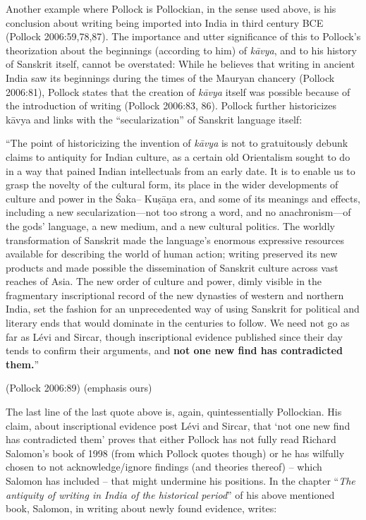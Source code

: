Another example where Pollock is Pollockian, in the sense used above, is his conclusion about writing being imported into India in third century BCE (Pollock 2006:59,78,87). The importance and utter significance of this to Pollock’s theorization about the beginnings (according to him) of \textit{kāvya}, and to his history of Sanskrit itself, cannot be overstated: While he believes that writing in ancient India saw its beginnings during the times of the Mauryan chancery (Pollock 2006:81), Pollock states that the creation of \textit{kāvya} itself was possible because of the introduction of writing (Pollock 2006:83, 86). Pollock further historicizes kāvya and links with the “secularization” of Sanskrit language itself:

\begin{myquote}
“The point of historicizing the invention of \textit{kāvya} is not to gratuitously debunk claims to antiquity for Indian culture, as a certain old Orientalism sought to do in a way that pained Indian intellectuals from an early date. It is to enable us to grasp the novelty of the cultural form, its place in the wider developments of culture and power in the Śaka– Kuṣāṇa era, and some of its meanings and effects, including a new secularization—not too strong a word, and no anachronism—of the gods’ language, a new medium, and a new cultural politics. The worldly transformation of Sanskrit made the language’s enormous expressive resources available for describing the world of human action; writing preserved its new products and made possible the dissemination of Sanskrit culture across vast reaches of Asia. The new order of culture and power, dimly visible in the fragmentary inscriptional record of the new dynasties of western and northern India, set the fashion for an unprecedented way of using Sanskrit for political and literary ends that would dominate in the centuries to follow. We need not go as far as Lévi and Sircar, though inscriptional evidence published since their day tends to confirm their arguments, and \textbf{not one new find has contradicted them.}”
\end{myquote}

\hfill (Pollock 2006:89) (emphasis ours)

The last line of the last quote above is, again, quintessentially Pollockian. His claim, about inscriptional evidence post Lévi and Sircar, that ‘not one new find has contradicted them’ proves that either Pollock has not fully read Richard Salomon’s book of 1998 (from which Pollock quotes though) or he has wilfully chosen to not acknowledge/ignore findings (and theories thereof) – which Salomon has included – that might undermine his positions. In the chapter “\textit{The antiquity of writing in India of the historical period}” of his above mentioned book, Salomon, in writing about newly found evidence, writes:

